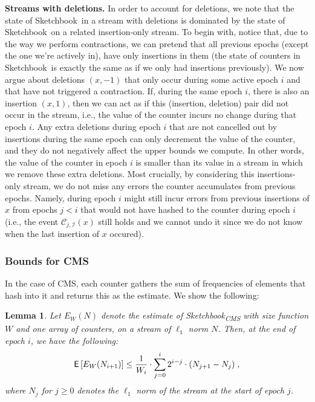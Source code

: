 \documentclass[sigconf]{acmart}
\newtheorem{lemma}[theorem]{Lemma}
\newcommand{\sketch}{Sketchbook}
\newcommand{\sketchcms}{\sketch\textsubscript{CMS}\xspace}
\begin{document}
\medskip\noindent
\textbf{Streams with deletions.} In order to account for deletions, we note that the state of \sketch\ in a stream with deletions is dominated by the state of \sketch\ on a related insertion-only stream. To begin with, notice that, due to the way we perform contractions, we can pretend that all previous epochs (except the one we're actively in), have only insertions in them (the state of counters in \sketch\ is exactly the same as if we only had insertions previously). We now argue about deletions $(x,-1)$ that only occur during some active epoch $i$ and that have not triggered a contraction.  If, during the same epoch $i$, there is also an insertion $(x,1)$, then we can act as if this (insertion, deletion) pair did not occur in the stream, i.e., the value of the counter incurs no change during that epoch $i$. Any extra deletions during epoch $i$ that are not cancelled out by insertions during the same epoch can only decrement the value of the counter, and they do not negatively affect the upper bounds we compute.  In other words, the value of the counter in epoch $i$ is smaller than its value in a stream in which we remove these extra deletions. Most crucially, by considering this insertions-only stream, we do not miss any errors the counter accumulates  from previous epochs. Namely, during epoch $i$ might still incur errors from previous insertions of $x$ from epochs $j<i$ that would not have hashed to the counter during epoch $i$ (i.e., the event $\mathcal{C}_{j,\mathcal{I}}(x)$ still holds and we cannot undo it since we do not know when the last insertion of $x$ occured).



\subsubsection{Bounds for CMS}
In the case of CMS, each counter gathers the sum of frequencies of elements that hash into it and returns this as the estimate. We show the following:


\begin{lemma}\label{lemma:cms-w}
Let $E_W(N)$  denote the estimate of \sketchcms  with size function $W$ and one array of counters, on a stream of $\ell_1$ norm $N$. Then, at the end of epoch $i$, we have the following:
$$\mathsf{E}\left[ E_W(N_{i+1}) \right] \leq  \frac{1}{W_i} \cdot 	\sum_{j=0}^i  2^{i-j} \cdot  (N_{j+1} - N_j) \;,$$
where $N_{j}$ for $j\geq 0$ denotes the $\ell_1$ norm of the stream at the start of epoch $j$. 
\end{lemma}
\end{document}
